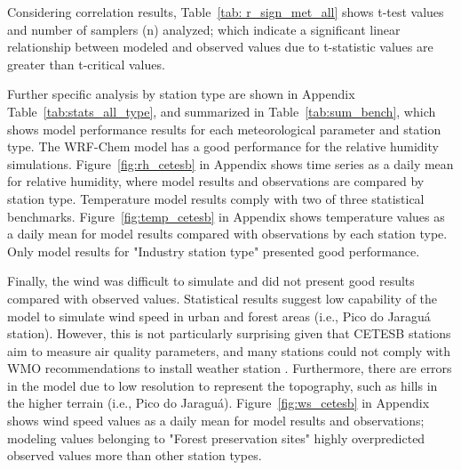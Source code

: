 Considering correlation results, Table~\ref{tab: r_sign_met_all} shows t-test values and number of samplers (n) analyzed; which indicate a significant linear relationship between modeled and observed values due to t-statistic values are greater than t-critical values.



Further specific analysis by station type are shown in Appendix Table~\ref{tab:stats_all_type}, and summarized in Table~\ref{tab:sum_bench}, which shows model performance results for each meteorological parameter and station type.
The WRF-Chem model has a good performance for the relative humidity simulations.
Figure~\ref{fig:rh_cetesb} in Appendix shows time series as a daily mean for relative humidity, where model results and observations are compared by station type. 
Temperature model results comply with two of three statistical benchmarks.
Figure~\ref{fig:temp_cetesb} in Appendix shows temperature values as a daily mean for model results compared with observations by each station type.
Only model results for "Industry station type" presented good performance.

Finally, the wind was difficult to simulate and did not present good results compared with observed values.
Statistical results suggest low capability of the model to simulate wind speed in urban and forest areas (i.e., Pico do Jaraguá station).
However, this is not particularly surprising given that CETESB stations aim to measure air quality parameters, and many stations could not comply with WMO recommendations to install weather station \citep{WMO2018}.
Furthermore, there are errors in the model due to low resolution to represent the topography, such as hills in the higher terrain (i.e., Pico do Jaraguá). 
Figure~\ref{fig:ws_cetesb} in Appendix shows wind speed values as a daily mean for model results and observations; modeling values belonging to "Forest preservation sites" highly overpredicted observed values more than other station types.

